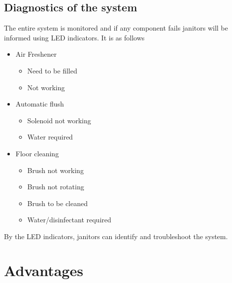 \documentclass[conference]{IEEEtran}
\begin{document}
            \subsection{Diagnostics of the system}
                The entire system is monitored and if any component fails janitors will be informed using LED indicators. It is as follows
                \begin{itemize}
                \item Air Freshener
                \begin{itemize}
                    \item Need to be filled 
                    \item Not working 
                \end{itemize}
                \item Automatic flush
                \begin{itemize}
                    \item Solenoid not working
                    \item Water required
                \end{itemize}
                \item Floor cleaning
                \begin{itemize}
                    \item Brush not working
                    \item Brush not rotating
                    \item Brush to be cleaned
                    \item Water/disinfectant required
                \end{itemize}
\end{itemize}

By the LED indicators, janitors can identify and troubleshoot the system.

\section{Advantages}
\end{document}
